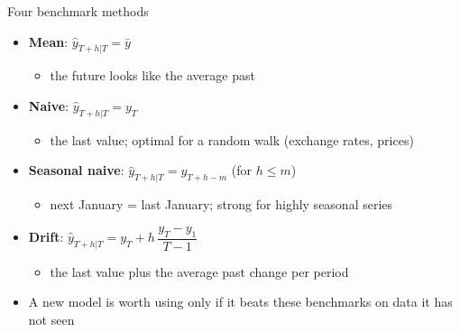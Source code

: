 \begin{frame}{Four benchmark methods}
\itemsize{\small}
\begin{itemize}
    \item \textbf{Mean}: $\hat y_{T+h|T} = \bar y$
    \begin{itemize}
        \item the future looks like the average past
    \end{itemize}
    \item \textbf{Naive}: $\hat y_{T+h|T} = y_T$
    \begin{itemize}
        \item the last value; optimal for a random walk (exchange rates, prices)
    \end{itemize}
    \item \textbf{Seasonal naive}: $\hat y_{T+h|T} = y_{T+h-m}$ (for $h \le m$)
    \begin{itemize}
        \item next January = last January; strong for highly seasonal series
    \end{itemize}
    \item \textbf{Drift}: $\hat y_{T+h|T} = y_T + h\, \dfrac{y_T - y_1}{T - 1}$
    \begin{itemize}
        \item the last value plus the average past change per period
    \end{itemize}
    \item A new model is worth using only if it beats these benchmarks on data it has not seen
\end{itemize}
\end{frame}

